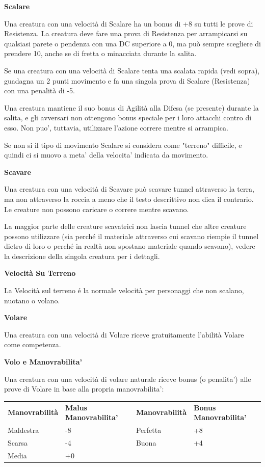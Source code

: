 \documentclass[a4paper,11pt,twoside,openany]{book}
\begin{document}
\textbf{Scalare}

Una creatura con una velocità di Scalare ha un bonus di +8 su tutti le prove di Resistenza. La creatura deve fare una prova di Resistenza per arrampicarsi su qualsiasi parete o pendenza con una DC superiore a 0, ma può sempre scegliere di prendere 10, anche se di fretta o minacciata durante la salita.

Se una creatura con una velocità di Scalare tenta una scalata rapida (vedi sopra), guadagna un 2 punti movimento e fa una singola prova di Scalare (Resistenza) con una penalità di -5.

Una creatura mantiene il suo bonus di Agilità alla Difesa (se presente) durante la salita, e gli avversari non ottengono bonus speciale per i loro attacchi contro di esso. Non puo', tuttavia, utilizzare l'azione correre mentre si arrampica.

Se non si il tipo di movimento Scalare si considera come "terreno" difficile, e quindi ci si muovo a meta' della velocita' indicata da movimento.

\textbf{Scavare}

Una creatura con una velocità di Scavare può scavare tunnel attraverso la terra, ma non attraverso la roccia a meno che il testo descrittivo non dica il contrario. Le creature non possono caricare o correre mentre scavano.

La maggior parte delle creature scavatrici non lascia tunnel che altre creature possono utilizzare (sia perché il materiale attraverso cui scavano riempie il tunnel dietro di loro o perché in realtà non spostano materiale quando scavano), vedere la descrizione della singola creatura per i dettagli.

\textbf{Velocità Su Terreno}

La Velocità sul terreno é la normale velocità per personaggi che non scalano, nuotano o volano.

\textbf{Volare}

Una creatura con una velocità di Volare riceve gratuitamente l'abilità Volare come competenza.

\textbf{Volo e Manovrabilita'}

\medskip

Una creatura con una velocità di volare naturale riceve bonus (o penalita') alle prove di Volare in base alla propria manovrabilita':

\begin{tabular}{llll}
	\hline
	\textbf{Manovrabilità} & \textbf{ Malus Manovrabilita'} & \textbf{Manovrabilità} & \textbf{ Bonus Manovrabilita'} \\
	Maldestra              & -8             & Perfetta               & +8             \\
	Scarsa & -4             & Buona  & +4             \\
	Media  & +0       \\
\end{tabular}
\end{document}
